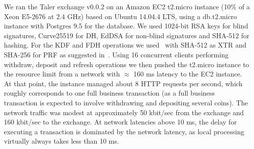\documentclass[sigconf, authordraft]{acmart}
\begin{document}

We ran the Taler exchange v0.0.2 on an Amazon EC2 t2.micro instance
(10\% of a Xeon E5-2676 at 2.4 GHz) based on Ubuntu 14.04.4 LTS, using
a db.t2.micro instance with Postgres 9.5 for the database.  We used
1024-bit RSA keys for blind signatures, Curve25519 for DH, EdDSA
for non-blind signatures and SHA-512 for hashing.  For the KDF and
FDH operations we used~\cite{rfc5869} with SHA-512 as XTR and SHA-256
for PRF as suggested in~\cite{rfc5869}.  Using 16
concurrent clients performing withdraw, deposit and refresh operations
we then pushed the t2.micro instance to the resource limit
from a network with $\approx$ 160 ms latency to
the EC2 instance.  At that point, the instance managed about 8 HTTP
requests per second, which roughly corresponds to one full business
transaction (as a full business transaction is expected to involve
withdrawing and depositing several coins).  The network traffic was
modest at approximately 50 kbit/sec from the exchange
and 160 kbit/sec to the exchange.
At network latencies above 10 ms, the delay
for executing a transaction is dominated by the network latency, as
local processing virtually always takes less than 10 ms.
\end{document}
